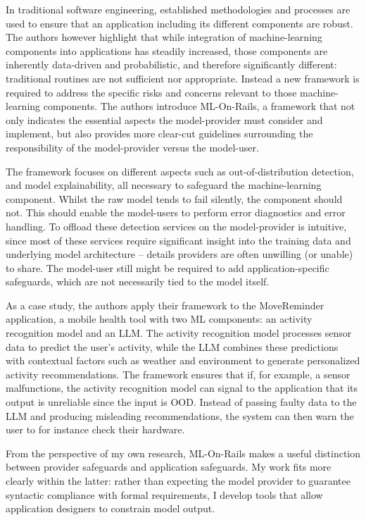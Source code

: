 \documentclass[a4paper, 11pt]{article}
\begin{document}
In traditional software engineering, established methodologies and processes are used to ensure that an application including its different components are robust. The authors however highlight that while integration of machine-learning components into applications has steadily increased, those components are inherently data-driven and probabilistic, and therefore significantly different: traditional routines are not sufficient nor appropriate. Instead a new framework is required to address the specific risks and concerns relevant to those machine-learning components. The authors introduce ML-On-Rails, a framework that not only indicates the essential aspects the model-provider must consider and implement, but also provides more clear-cut guidelines surrounding the responsibility of the model-provider versus the model-user. 

The framework focuses on different aspects such as out-of-distribution detection, and model explainability, all necessary to safeguard the machine-learning component. Whilst the raw model tends to fail silently, the component should not. This should enable the model-users to perform error diagnostics and error handling. To offload these detection services on the model-provider is intuitive, since most of these services require significant insight into the training data and underlying model architecture – details providers are often unwilling (or unable) to share. The model-user still might be required to add application-specific safeguards, which are not necessarily tied to the model itself. 

As a case study, the authors apply their framework to the MoveReminder application, a mobile health tool with two ML components: an activity recognition model and an LLM. The activity recognition model processes sensor data to predict the user’s activity, while the LLM combines these predictions with contextual factors such as weather and environment to generate personalized activity recommendations. The framework ensures that if, for example, a sensor malfunctions, the activity recognition model can signal to the application that its output is unreliable since the input is OOD. Instead of passing faulty data to the LLM and producing misleading recommendations, the system can then warn the user to for instance check their hardware.

From the perspective of my own research, ML-On-Rails makes a useful distinction between provider safeguards and application safeguards. My work fits more clearly within the latter: rather than expecting the model provider to guarantee syntactic compliance with formal requirements, I develop tools that allow application designers to constrain model output. 
\end{document}
